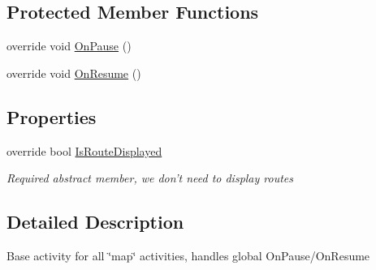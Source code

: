 \subsection*{Protected Member Functions}
\begin{DoxyCompactItemize}
\item 
override void \hyperlink{class_field_service_1_1_android_1_1_base_map_activity_af84e0668330717ea3b6a99371e135f19}{On\+Pause} ()
\item 
override void \hyperlink{class_field_service_1_1_android_1_1_base_map_activity_a6d6aea5274d6650c19c188fcb9ba516b}{On\+Resume} ()
\end{DoxyCompactItemize}
\subsection*{Properties}
\begin{DoxyCompactItemize}
\item 
override bool \hyperlink{class_field_service_1_1_android_1_1_base_map_activity_a045d06e475e2fbad8de9344045e7f104}{Is\+Route\+Displayed}
\begin{DoxyCompactList}\small\item\em Required abstract member, we don't need to display routes \end{DoxyCompactList}\end{DoxyCompactItemize}


\subsection{Detailed Description}
Base activity for all \char`\"{}map\char`\"{} activities, handles global On\+Pause/\+On\+Resume 



